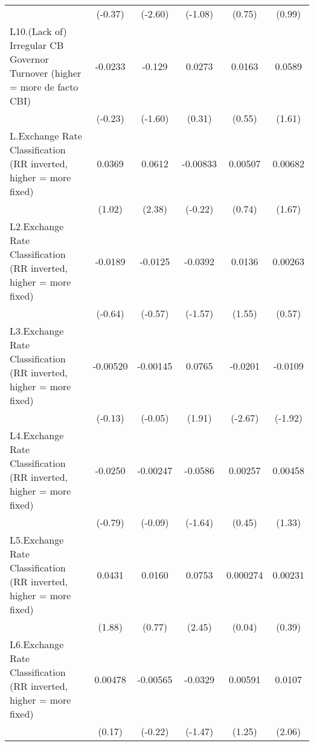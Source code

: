 {\begin{tabular}{l*{5}{c}}
                &  (-0.37)         &  (-2.60)         &  (-1.08)         &   (0.75)         &   (0.99)         \\
[1em]
L10.(Lack of) Irregular CB Governor Turnover (higher = more de facto CBI)&  -0.0233         &   -0.129         &   0.0273         &   0.0163         &   0.0589         \\
                &  (-0.23)         &  (-1.60)         &   (0.31)         &   (0.55)         &   (1.61)         \\
[1em]
L.Exchange Rate Classification (RR inverted, higher = more fixed)&   0.0369         &   0.0612\sym{*}  & -0.00833         &  0.00507         &  0.00682         \\
                &   (1.02)         &   (2.38)         &  (-0.22)         &   (0.74)         &   (1.67)         \\
[1em]
L2.Exchange Rate Classification (RR inverted, higher = more fixed)&  -0.0189         &  -0.0125         &  -0.0392         &   0.0136         &  0.00263         \\
                &  (-0.64)         &  (-0.57)         &  (-1.57)         &   (1.55)         &   (0.57)         \\
[1em]
L3.Exchange Rate Classification (RR inverted, higher = more fixed)& -0.00520         & -0.00145         &   0.0765         &  -0.0201\sym{**} &  -0.0109         \\
                &  (-0.13)         &  (-0.05)         &   (1.91)         &  (-2.67)         &  (-1.92)         \\
[1em]
L4.Exchange Rate Classification (RR inverted, higher = more fixed)&  -0.0250         & -0.00247         &  -0.0586         &  0.00257         &  0.00458         \\
                &  (-0.79)         &  (-0.09)         &  (-1.64)         &   (0.45)         &   (1.33)         \\
[1em]
L5.Exchange Rate Classification (RR inverted, higher = more fixed)&   0.0431         &   0.0160         &   0.0753\sym{*}  & 0.000274         &  0.00231         \\
                &   (1.88)         &   (0.77)         &   (2.45)         &   (0.04)         &   (0.39)         \\
[1em]
L6.Exchange Rate Classification (RR inverted, higher = more fixed)&  0.00478         & -0.00565         &  -0.0329         &  0.00591         &   0.0107\sym{*}  \\
                &   (0.17)         &  (-0.22)         &  (-1.47)         &   (1.25)         &   (2.06)         \\

\end{tabular}}
